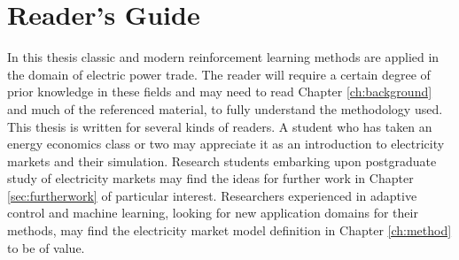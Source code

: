

\section{Reader's Guide}
In this thesis classic and modern reinforcement learning methods are applied in
the domain of electric power trade.  The reader will require a certain degree
of prior knowledge in these fields and may need to read Chapter
\ref{ch:background} and much of the referenced material, to fully understand
the methodology used.  This thesis is written for several kinds of readers.  A
student who has taken an energy economics class or two may appreciate it as an
introduction to electricity markets and their simulation.  Research students
embarking upon postgraduate study of electricity markets may find the ideas
for further work in Chapter \ref{sec:furtherwork} of particular interest.
Researchers experienced in adaptive control and machine learning, looking for
new application domains for their methods, may find the electricity market
model definition in Chapter \ref{ch:method} to be of value.

